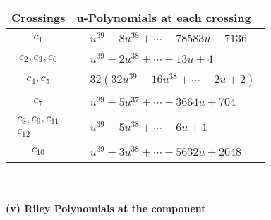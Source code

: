 \documentclass[1p]{elsarticle_modified}
\theoremstyle{definition}
\begin{document}
\begin{tabular}{m{50pt}|m{274pt}}
Crossings & \hspace{64pt}u-Polynomials at each crossing \\
\hline $$\begin{aligned}c_{1}\end{aligned}$$&$\begin{aligned}
&u^{39}-8 u^{38}+\cdots+78583 u-7136
\end{aligned}$\\
\hline $$\begin{aligned}c_{2},c_{3},c_{6}\end{aligned}$$&$\begin{aligned}
&u^{39}-2 u^{38}+\cdots+13 u+4
\end{aligned}$\\
\hline $$\begin{aligned}c_{4},c_{5}\end{aligned}$$&$\begin{aligned}
&32(32 u^{39}-16 u^{38}+\cdots+2 u+2)
\end{aligned}$\\
\hline $$\begin{aligned}c_{7}\end{aligned}$$&$\begin{aligned}
&u^{39}-5 u^{37}+\cdots+3664 u+704
\end{aligned}$\\
\hline $$\begin{aligned}c_{8},c_{9},c_{11}\\c_{12}\end{aligned}$$&$\begin{aligned}
&u^{39}+5 u^{38}+\cdots-6 u+1
\end{aligned}$\\
\hline $$\begin{aligned}c_{10}\end{aligned}$$&$\begin{aligned}
&u^{39}+3 u^{38}+\cdots+5632 u+2048
\end{aligned}$\\
\hline
\end{tabular}\\~\\
\newpage\renewcommand{\arraystretch}{1}
\flushleft \textbf{(v) Riley Polynomials at the component}\newline \\
\end{document}
